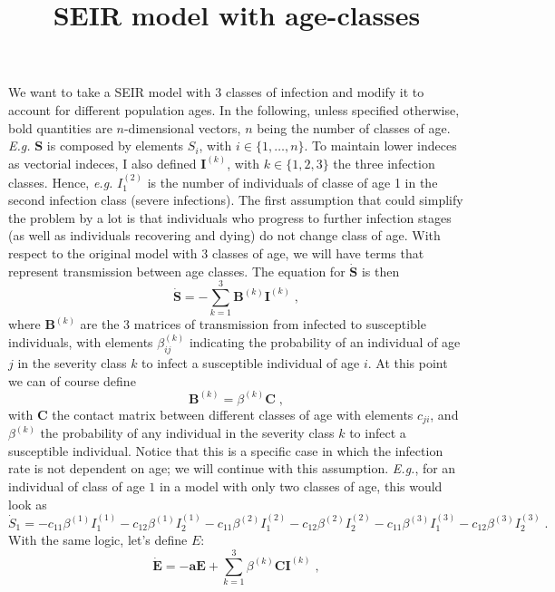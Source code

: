 \documentclass[12pt,a4paper]{article}
\title{SEIR model with age-classes}
\begin{document}
\maketitle
We want to take a SEIR model with 3 classes of infection and modify it to account for different population ages. In the following, unless specified otherwise, bold quantities are $n$-dimensional vectors, $n$ being the number of classes of age. \textit{E.g.} $\mathbf{S}$ is composed by elements $S_i$, with $i \in \{1,\dots, n\}$. To maintain lower indeces as vectorial indeces, I also defined $\mathbf{I}^{(k)}$, with $k\in\{1, 2, 3\}$ the three infection classes. Hence, \textit{e.g.} $I_1^{(2)}$ is the number of individuals of classe of age 1 in the second infection class (severe infections).
The first assumption that could simplify the problem by a lot is that individuals who progress to further infection stages (as well as individuals recovering and dying) do not change class of age. With respect to the original model with 3 classes of age, we will have terms that represent transmission between age classes. The equation for $\dot{\mathbf{S}}$ is then
\begin{equation}
\dot{\mathbf{S}} = -\sum_{k = 1}^{3} \mathbf{B}^{(k)} \mathbf{I}^{(k)}\;,
\end{equation}
where $\mathbf{B}^{(k)}$ are the 3 matrices of transmission from infected to susceptible individuals, with elements $\beta^{(k)}_{ij}$ indicating the probability of an individual of age $j$ in the severity class $k$ to infect a susceptible individual of age $i$. At this point we can of course define 
\begin{displaymath}
\mathbf{B}^{(k)} = \beta^{(k)}\mathbf{C}\;,
\end{displaymath}
with $\mathbf{C}$ the contact matrix between different classes of age with elements $c_{ji}$, and $\beta^{(k)}$ the probability of any individual in the severity class $k$ to infect a susceptible individual. Notice that this is a specific case in which the infection rate is not dependent on age; we will continue with this assumption. \textit{E.g.}, for an individual of class of age $1$ in a model with only two classes of age, this would look as
\begin{displaymath}
\dot{S}_1 = -c_{11}\beta^{(1)}I^{(1)}_1 - c_{12}\beta^{(1)}I^{(1)}_2 - c_{11}\beta^{(2)}I^{(2)}_1 - c_{12}\beta^{(2)}I^{(2)}_2 - c_{11}\beta^{(3)}I^{(3)}_1 - c_{12}\beta^{(3)}I^{(3)}_2 \;.
\end{displaymath}
With the same logic, let's define $E$:
\begin{equation}
\dot{\mathbf{E}} = -\mathbf{aE} + \sum_{k = 1}^{3} \beta^{(k)}\mathbf{C} \mathbf{I}^{(k)}\;,
\end{equation}
\end{document}
